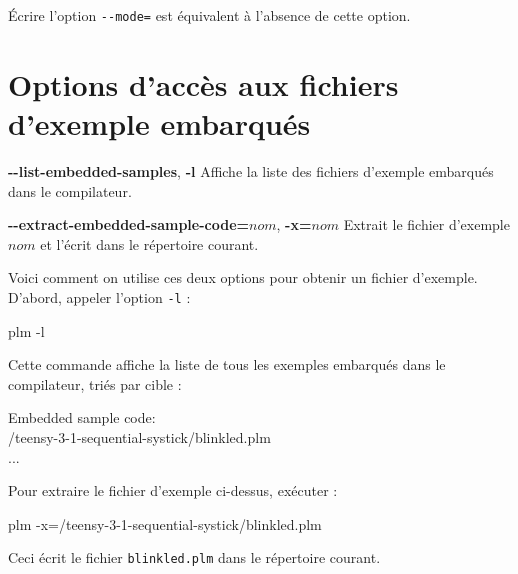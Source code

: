 Écrire l'option \texttt{-{}-mode=} est équivalent à l'absence de cette option.






\section{Options d'accès aux fichiers d'exemple embarqués}

{\ttfamily\bfseries-{}-list-embedded-samples}, {\ttfamily\bfseries-l} Affiche la liste des fichiers d'exemple embarqués dans le compilateur.

{\ttfamily\bfseries-{}-extract-embedded-sample-code=$nom$}, {\ttfamily\bfseries-x=$nom$} Extrait le fichier d'exemple $nom$ et l'écrit dans le répertoire courant.

Voici comment on utilise ces deux options pour obtenir un fichier d'exemple. D'abord, appeler l'option \texttt{-l} :

\begin{SHELL}
 plm -l
\end{SHELL}


Cette commande affiche la liste de tous les exemples embarqués dans le compilateur, triés par cible :

\begin{SHELL}
Embedded sample code:\\ 
\hspace*{1.2em}/teensy-3-1-sequential-systick/blinkled.plm\\
\hspace*{1.2em}...
\end{SHELL}


Pour extraire le fichier d'exemple ci-dessus, exécuter :

\begin{SHELL}
plm -x=/teensy-3-1-sequential-systick/blinkled.plm
\end{SHELL}


Ceci écrit le fichier \texttt{blinkled.plm} dans le répertoire courant.

